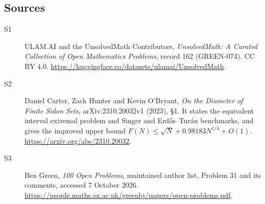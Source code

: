 \documentclass[11pt]{article}
\begin{document}
\subsection{Sources}
\begin{description}
\item[\hypertarget{source:162:1}{S1}] ULAM.AI and the UnsolvedMath Contributors, \emph{UnsolvedMath: A Curated Collection of Open Mathematics Problems}, record 162 (GREEN-074). CC BY 4.0. \url{https://huggingface.co/datasets/ulamai/UnsolvedMath}.
\item[\hypertarget{source:162:2}{S2}] Daniel Carter, Zach Hunter and Kevin O’Bryant, \emph{On the Diameter of Finite Sidon Sets}, arXiv:2310.20032v1 (2023), §1. It states the equivalent interval extremal problem and Singer and Erdős--Turán benchmarks, and gives the improved upper bound $F(N)\leq\sqrt N+0.98183N^{1/4}+O(1)$. \url{https://arxiv.org/abs/2310.20032}.
\item[\hypertarget{source:162:3}{S3}] Ben Green, \emph{100 Open Problems}, maintained author list, Problem 31 and its comments, accessed 7 October 2026. \url{https://people.maths.ox.ac.uk/greenbj/papers/open-problems.pdf}.
\end{description}
\label{end:162}
\end{document}
